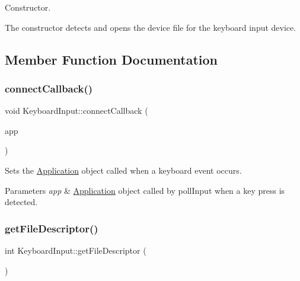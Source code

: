 Constructor. 

The constructor detects and opens the device file for the keyboard input device. 

\subsection{Member Function Documentation}
\mbox{\label{classdrumpi_1_1KeyboardInput_acd7e27115fbb3b81bc3d1b771ef89ca8}} 
\subsubsection{\texorpdfstring{connect\+Callback()}{connectCallback()}}
{\footnotesize\ttfamily void Keyboard\+Input\+::connect\+Callback (\begin{DoxyParamCaption}\item[{\hyperlink{classdrumpi_1_1ApplicationCallback}{Application\+Callback} $\ast$}]{app }\end{DoxyParamCaption})}



Sets the \hyperlink{classdrumpi_1_1Application}{Application} object called when a keyboard event occurs. 


\begin{DoxyParams}{Parameters}
{\em app} & \hyperlink{classdrumpi_1_1Application}{Application} object called by poll\+Input when a key press is detected. \\
\hline
\end{DoxyParams}
\mbox{\label{classdrumpi_1_1KeyboardInput_a9541bb7ef3f3c78c448e7b18aec1dbd7}} 
\subsubsection{\texorpdfstring{get\+File\+Descriptor()}{getFileDescriptor()}}
{\footnotesize\ttfamily int Keyboard\+Input\+::get\+File\+Descriptor (\begin{DoxyParamCaption}{ }\end{DoxyParamCaption})}

